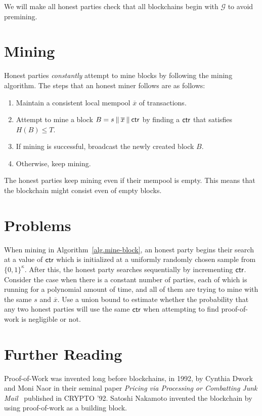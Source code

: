 We will make all honest parties check that all blockchains begin with $\mathcal{G}$ to avoid
premining.

\section{Mining}

Honest parties \emph{constantly} attempt to mine blocks by following the mining algorithm.
The steps that an honest miner follows are as follows:

\begin{enumerate}
  \item Maintain a consistent local mempool $\overline{x}$ of transactions.
  \item Attempt to mine a block $B = s \mathbin{\|} \overline{x} \mathbin{\|} \mathsf{ctr}$ by finding a $\mathsf{ctr}$ that satisfies $H(B) \leq T$.
  \item If mining is successful, broadcast the newly created block $B$.
  \item Otherwise, keep mining.
\end{enumerate}

The honest parties keep mining even if their mempool is empty. This means that the blockchain
might consist even of empty blocks.

\section*{Problems}

\begin{problems}
  \item When mining in Algorithm~\ref{alg.mine-block}, an honest party begins their search at a
        value of $\mathsf{ctr}$ which is initialized at a uniformly randomly chosen sample from $\{0, 1\}^\kappa$.
        After this, the honest party searches sequentially by incrementing $\mathsf{ctr}$.
        Consider the case when there is a constant number of parties, each of which is running for a
        polynomial amount of time, and all of them are trying to mine with the same $s$ and $\overline{x}$.
        Use a union bound to estimate whether the probability that any two honest parties will use
        the same $\mathsf{ctr}$ when attempting to find proof-of-work is negligible or not.
\end{problems}

\section*{Further Reading}

Proof-of-Work was invented long before blockchains, in 1992, by Cynthia Dwork and Moni Naor
in their seminal paper \emph{Pricing via Processing or Combatting Junk Mail}~\cite{pow} published
in CRYPTO '92. Satoshi Nakamoto invented the blockchain by using proof-of-work as a building block.
